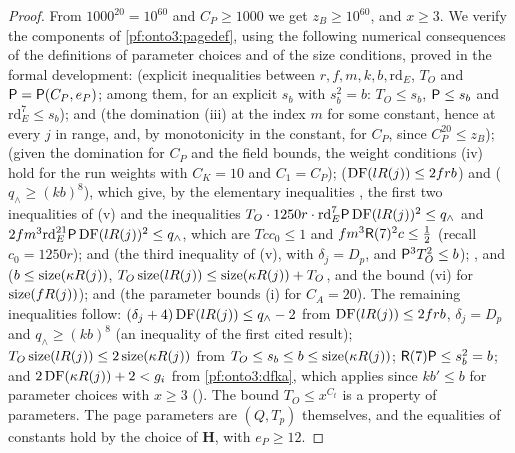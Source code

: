 \begin{proof}
From $1000^{20}=10^{60}$ and $C_P\ge1000$ we get $z_B\ge10^{60}$, and $x\ge3$. We verify the components of
\cref{pf:onto3:pagedef}, using the following numerical consequences of the definitions of parameter choices and of the
size conditions, proved in the formal development:
 (explicit inequalities between $r,f,m,k,b,\mathrm{rd}_E$,
$T_O$ and $\mathsf{P}=\mathsf{P}(C_P,e_P)$; among them, for an explicit $s_b$ with $s_b^2=b$: $T_O\le s_b$,
$\mathsf{P}\le s_b$ and $\mathrm{rd}_E^7\le s_b$);
 and 
(the domination (iii) at the index $m$ for some constant, hence at every $j$ in range, and, by monotonicity in the
constant, for $C_P$, since $C_P^{20}\le z_B$);
 (given the domination for $C_P$ and the field bounds, the weight
conditions (iv) hold for the run weights with $C_K=10$ and $C_1=C_P$);
 ($\operatorname{DF}(lR(j))\le2frb$) and
 ($q_\wedge\ge(kb)^8$), which give, by the elementary
inequalities , the first two inequalities of (v) and the inequalities
$T_O\cdot1250r\cdot\mathrm{rd}_E^7\mathsf{P}\operatorname{DF}(lR(j))^2\le q_\wedge$ and $2fm^3\mathrm{rd}_E^{21}\mathsf{P}
\operatorname{DF}(lR(j))^2\le q_\wedge$, which are $Tcc_0\le1$ and $fm^3\mathsf{R}(7)^2c\le\frac12$ (recall $c_0=1250r$);
 and
 (the third inequality of (v), with
$\delta_j=D_p$, and $\mathsf{P}^3T_O^2\le b$);
,  and
 ($b\le\operatorname{size}(\kappa R(j))$, $T_O\operatorname{size}(lR(j))\le
\operatorname{size}(\kappa R(j))+T_O$, and the bound (vi) for $\operatorname{size}(fR(j))$); and
 (the parameter bounds (i) for $C_A=20$).
The remaining inequalities follow: $(\delta_j+4)\operatorname{DF}(lR(j))\le q_\wedge-2$ from $\operatorname{DF}(lR(j))\le2frb$,
$\delta_j=D_p$ and $q_\wedge\ge(kb)^8$ (an inequality of the first cited result); $T_O\operatorname{size}(lR(j))\le2
\operatorname{size}(\kappa R(j))$ from $T_O\le s_b\le b\le\operatorname{size}(\kappa R(j))$; $\mathsf{R}(7)\mathsf{P}\le s_b^2=b$; and
$2\operatorname{DF}(\kappa R(j))+2<g_i$ from \cref{pf:onto3:dfka}, which applies since $kb'\le b$ for parameter choices with
$x\ge3$ (). The bound $T_O\le x^{C_t}$ is a property of parameters.
The page parameters are $(Q,T_p)$ themselves, and the equalities of constants hold by the choice of $\mathbf H$, with
$e_P\ge12$.
\end{proof}

